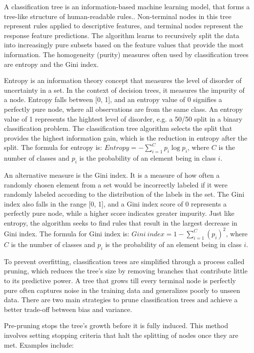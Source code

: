 \documentclass[conference]{IEEEtran}
\begin{document}
A classification tree is an information-based machine learning model, that forms a tree-like structure of human-readable rules.. Non-terminal nodes in this tree represent rules applied to descriptive features, and terminal nodes represent the response feature predictions. The algorithm learns to recursively split the data into increasingly pure subsets based on the feature values that provide the most information. The homogeneity (purity) measures often used by classification trees are entropy and the Gini index.

Entropy is an information theory concept that measures the level of disorder of uncertainty in a set. In the context of decision trees, it measures the impurity of a node. Entropy falls between [0, 1], and an entropy value of 0 signifies a perfectly pure node, where all observations are from the same class. An entropy value of 1 represents the hightest level of disorder, e.g. a 50/50 split in a binary classification problem. The classification tree algorithm selects the split that provides the highest information gain, which is the reduction in entropy after the split. The formula for entropy is: $Entropy = -\sum_{i=1}^{C} p_i \log p_i$, where $C$ is the number of classes and $p_i$ is the probability of an element being in class $i$.

An alternative measure is the Gini index. It is a measure of how often a randomly chosen element from a set would be incorrectly labeled if it were randomly labeled according to the distribution of the labels in the set. The Gini index also falls in the range [0, 1], and a Gini index score of 0 represents a perfectly pure node, while a higher score indicates greater impurity. Just like entropy, the algorithm seeks to find rules that result in the largest decrease in Gini index. The formula for Gini index is: $Gini\ index = 1 - \sum_{i=1}^{C} (p_i)^2$, where $C$ is the number of classes and $p_i$ is the probability of an element being in class $i$.

To prevent overfitting, classification trees are simplified through a process called pruning, which reduces the tree's size by removing branches that contribute little to its predictive power. A tree that grows till every terminal node is perfectly pure often captures noise in the training data and generalizes poorly to unseen data. There are two main strategies to prune classification trees and achieve a better trade-off between bias and variance.

Pre-pruning stops the tree's growth before it is fully induced. This method involves setting stopping criteria that halt the splitting of nodes once they are met. Examples include:
\end{document}
